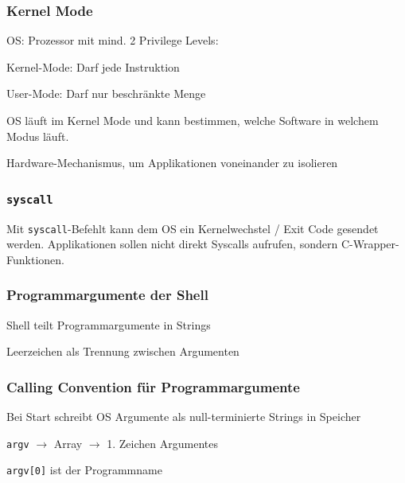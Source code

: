 \begin{multicols*}{5}
    \subsubsection{Kernel Mode}
    \begin{compactitem}[$\bullet$]
		\item OS: Prozessor mit mind. 2 Privilege Levels:
		\begin{compactitem}
			\item \textcolor{h}{Kernel-Mode:} Darf jede Instruktion
			\item \textcolor{h}{User-Mode:} Darf nur beschränkte Menge
		\end{compactitem}
		\item OS läuft im Kernel Mode und kann bestimmen, welche Software in welchem Modus läuft.
		\item Hardware-Mechanismus, um Applikationen voneinander zu isolieren
    \end{compactitem}
    
    \subsubsection{\texttt{syscall}}
    
    Mit \texttt{syscall}-Befehlt kann dem OS ein Kernelwechstel / Exit Code gesendet werden.
    Applikationen sollen nicht direkt Syscalls aufrufen, sondern C-Wrapper-Funktionen.
    
	\subsubsection{Programmargumente der Shell}
        \begin{compactitem}[$\bullet$]
            \item Shell teilt Programmargumente in Strings
            \item Leerzeichen als Trennung zwischen Argumenten
        \end{compactitem}
    
    
    \subsubsection{Calling Convention für Programmargumente}
		\begin{compactitem} [$\bullet$]
			\item Bei Start schreibt OS Argumente als null-terminierte Strings in Speicher
			\item \texttt{argv} $\rightarrow$ Array $\rightarrow$ 1. Zeichen Argumentes
			\item \texttt{argv[0]} ist der Programmname
        \end{compactitem}
    

\end{multicols*}
